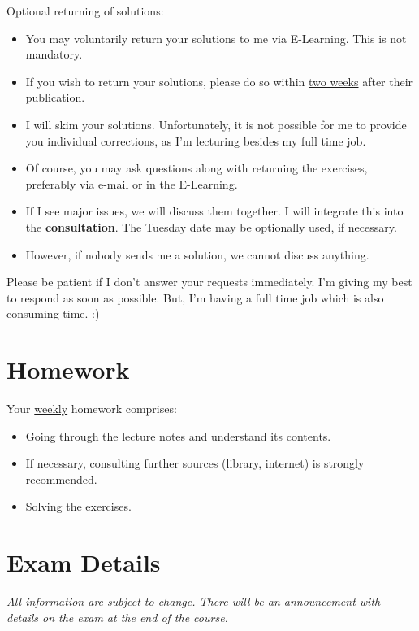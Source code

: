 Optional returning of solutions:
\begin{itemize}
	\item You may voluntarily return your solutions to me via E-Learning. This is not mandatory.
	\item If you wish to return your solutions, please do so within \underline{two weeks} after their publication.
	\item I will skim your solutions. Unfortunately, it is not possible for me to provide you individual corrections, as I'm lecturing besides my full time job.
	\item Of course, you may ask questions along with returning the exercises, preferably via e-mail or in the E-Learning.
	\item If I see major issues, we will discuss them together. I will integrate this into the \textbf{consultation}. The Tuesday date may be optionally used, if necessary.
	\item However, if nobody sends me a solution, we cannot discuss anything.
\end{itemize}

Please be patient if I don't answer your requests immediately. I'm giving my best to respond as soon as possible. But, I'm having a full time job which is also consuming time. :)


\section{Homework}

Your \underline{weekly} homework comprises:
\begin{itemize}
	\item Going through the lecture notes and understand its contents.
	\item If necessary, consulting further sources (library, internet) is strongly recommended.
	\item Solving the exercises.
\end{itemize}


\section{Exam Details}

\textit{All information are subject to change. There will be an announcement with details on the exam at the end of the course.}

